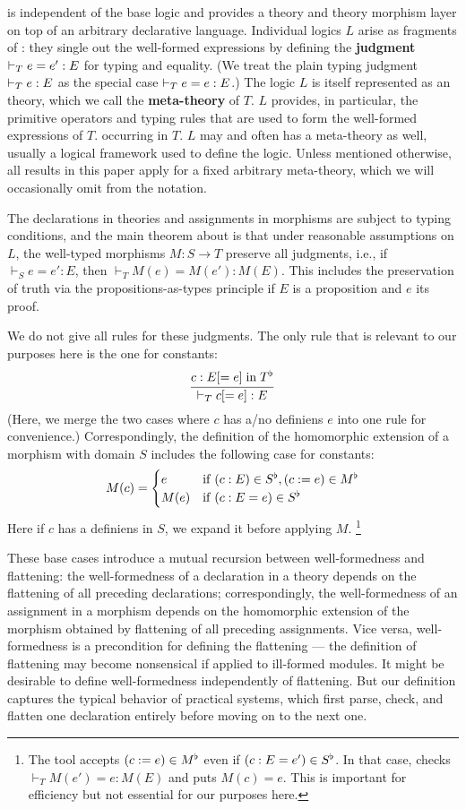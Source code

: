 \mmt is independent of the base logic and provides a theory and theory morphism layer on top of an arbitrary declarative language.
Individual logics $L$ arise as fragments of \mmt: they single out the well-formed expressions by defining the \textbf{judgment} $\vdash_T e=e':E$ for typing and equality.
(We treat the plain typing judgment $\vdash_T e:E$ as the special case $\vdash_T e=e:E$.)
The logic $L$ is itself represented as an \mmt theory, which we call the \textbf{meta-theory} of $T$.
$L$ provides, in particular, the primitive operators and typing rules that are used to form the well-formed expressions of $T$. occurring in $T$.
$L$ may and often has a meta-theory as well, usually a logical framework used to define the logic. 
Unless mentioned otherwise, all results in this paper apply for a fixed arbitrary meta-theory, which we will occasionally omit from the notation.

The declarations in theories and assignments in morphisms are subject to typing conditions, and the main theorem about \mmt is that under reasonable assumptions on $L$, the well-typed morphisms $M:S\to T$ preserve all judgments, i.e., if $\vdash_S e=e':E$, then $\vdash_T M(e)=M(e'):M(E)$.
This includes the preservation of truth via the propositions-as-types principle if $E$ is a proposition and $e$ its proof.

We do not give all rules for these judgments.
The only rule that is relevant to our purposes here is the one for constants:
\[\cfrac{c:E[=e] \;\mathrm{in}\; T^\flat}{\vdash_T c[=e]:E}\,\]
(Here, we merge the two cases where $c$ has a/no definiens $e$ into one rule for convenience.)
Correspondingly, the definition of the homomorphic extension of a morphism with domain $S$ includes the following case for constants:
\[M(c) = \begin{cases}e&\mathrm{if}\; (c:E) \in S^\flat, (c:=e)\in M^\flat \\ M(e) &\mathrm{if}\; (c:E=e)\in S^\flat\end{cases}\]
Here if $c$ has a definiens in $S$, we expand it before applying $M$.%
\footnote{The \mmt tool accepts $(c:=e)\in M^\flat$ even if $(c:E=e')\in S^\flat$. In that case, \mmt checks $\vdash_T M(e')=e:M(E)$ and puts $M(c)=e$. This is important for efficiency but not essential for our purposes here.}

These base cases introduce a mutual recursion between well-formedness and flattening:
the well-formedness of a declaration in a theory depends on the flattening of all preceding declarations;
correspondingly, the well-formedness of an assignment in a morphism depends on the homomorphic extension of the morphism obtained by flattening of all preceding assignments.
Vice versa, well-formedness is a precondition for defining the flattening --- the definition of flattening may become nonsensical if applied to ill-formed modules.
It might be desirable to define well-formedness independently of flattening.
But our definition captures the typical behavior of practical systems, which first parse, check, and flatten one declaration entirely before moving on to the next one.

